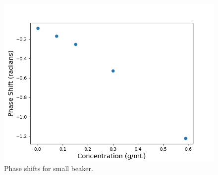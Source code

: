 \begin{figure}[H]
    \begin{center}
        \includegraphics[width=\columnwidth]{../figures/small_beaker_phase_shifts.png}
    \end{center}
    \caption{Phase shifts for small beaker.}
    \label{fig:small_beaker_phase_shifts}
\end{figure}
